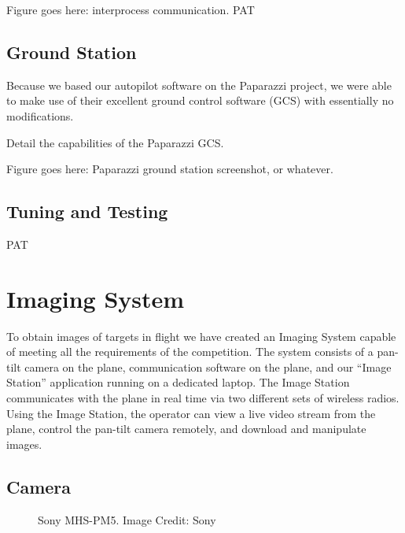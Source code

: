 \documentclass[10pt]{report}
\begin{document}
Figure goes here: interprocess communication. PAT
\subsection{Ground Station}
Because we based our autopilot software on the Paparazzi project, we were able to make use of their excellent ground control software (GCS) with essentially no modifications.

Detail the capabilities of the Paparazzi GCS.

Figure goes here: Paparazzi ground station screenshot, or whatever. 
\subsection{Tuning and Testing}
PAT

\section{Imaging System}

To obtain images of targets in flight we have created an Imaging System capable of meeting all the requirements of the competition.  The system consists of a pan-tilt camera on the plane, communication software on the plane, and our ``Image Station'' application running on a dedicated laptop.  The Image Station communicates with the plane in real time via two different sets of wireless radios.  Using the Image Station, the operator can view a live video stream from the plane, control the pan-tilt camera remotely, and download and manipulate images.

\subsection{Camera}
\begin{figure}
	\centering
	\caption{Sony MHS-PM5. Image Credit: Sony}
	\label{fig:camera}
\end{figure}
\end{document}
